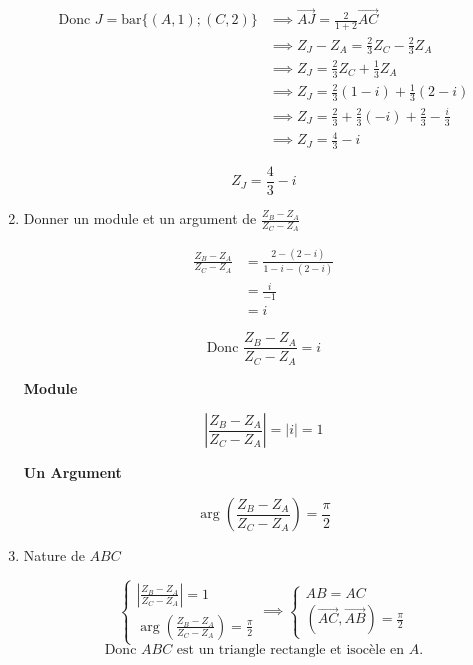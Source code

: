 \documentclass[12pt,a4paper]{article}
\begin{document}
\begin{enumerate}
\begin{align*}
\text{Donc } J = \text{bar}\{(A,1); (C,2)\} &\implies \overrightarrow{AJ} = \frac{2}{1+2} \overrightarrow{AC}\\
															 &\implies Z_J - Z_A = \frac{2}{3} Z_C - \frac{2}{3} Z_A\\
                               &\implies Z_J = \frac{2}{3} Z_C + \frac{1}{3} Z_A\\
                               &\implies Z_J = \frac{2}{3} (1 - i) + \frac{1}{3} (2 - i)\\
                               &\implies Z_J = \frac{2}{3} + \frac{2}{3} (-i) + \frac{2}{3} - \frac{i}{3}\\
                               &\implies Z_J = \frac{4}{3} - i
\end{align*}

\[
\boxed{Z_J = \frac{4}{3} - i}
\]

\item Donner un module et un argument de $\frac{Z_B - Z_A}{Z_C - Z_A}$

\begin{align*}
\frac{Z_B - Z_A}{Z_C - Z_A} &= \frac{2 - (2 - i)}{1 - i - (2 - i)}\\
														&= \frac{i}{-1}\\
														&= i
\end{align*}

\[
\text{Donc } \boxed{\frac{Z_B - Z_A}{Z_C - Z_A} = i}
\]

\textbf{Module}

\[
\left| \frac{Z_B - Z_A}{Z_C - Z_A} \right| = |i| = 1
\]

\textbf{Un Argument}

\[
\arg\left( \frac{Z_B - Z_A}{Z_C - Z_A} \right) = \frac{\pi}{2}
\]

\item Nature de $ABC$

\[
\begin{cases}
\left| \frac{Z_B - Z_A}{Z_C - Z_A} \right| = 1\\
\arg\left( \frac{Z_B - Z_A}{Z_C - Z_A} \right) = \frac{\pi}{2} 
\end{cases}\implies
\begin{cases}
AB = AC\\
\left(\overrightarrow{AC},\overrightarrow{AB} \right) = \frac{\pi}{2}
\end{cases}
\]
\[
\text{Donc } ABC \text{ est un triangle rectangle et isocèle en } A.
\]


\end{enumerate}
\end{document}
